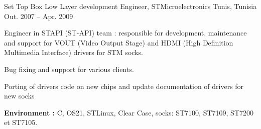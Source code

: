 \begin{cventries}

\cventry
{Set Top Box Low Layer development Engineer,} %
{STMicroelectronics} %
{Tunis, Tunisia } %
{Out. 2007 – Apr. 2009} %
{ %
\begin{cvitems}
\item {Engineer in STAPI (ST-API)  team : responsible for development, maintenance and support for VOUT (Video Output Stage) and HDMI (High Definition Multimedia Interface) drivers for STM socks.}
\item {Bug fixing  and support  for various clients. }
\item {Porting of drivers code on new chips and update documentation of drivers for new socks }
\item { \textbf{Environment :} C, OS21, STLinux, Clear Case, socks: ST7100, ST7109, ST7200 et ST7105. }
\end{cvitems}
}

\clearpage
\end{cventries}